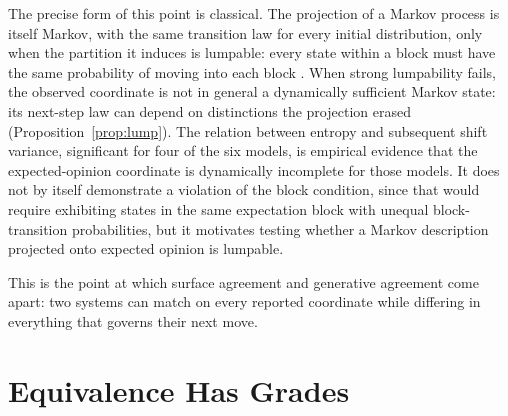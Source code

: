 \documentclass[11pt]{article}
\theoremstyle{definition}
\theoremstyle{remark}
\begin{document}
The precise form of this point is classical. The projection of a Markov process is itself Markov, with the same transition law for every initial distribution, only when the partition it induces is lumpable: every state within a block must have the same probability of moving into each block \cite{kemeny1960}. When strong lumpability fails, the observed coordinate is not in general a dynamically sufficient Markov state: its next-step law can depend on distinctions the projection erased (Proposition~\ref{prop:lump}). The relation between entropy and subsequent shift variance, significant for four of the six models, is empirical evidence that the expected-opinion coordinate is dynamically incomplete for those models. It does not by itself demonstrate a violation of the block condition, since that would require exhibiting states in the same expectation block with unequal block-transition probabilities, but it motivates testing whether a Markov description projected onto expected opinion is lumpable.

This is the point at which surface agreement and generative agreement come apart: two systems can match on every reported coordinate while differing in everything that governs their next move.

\section{Equivalence Has Grades}
\end{document}
